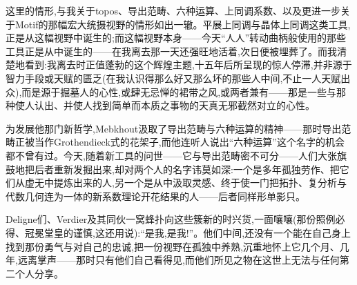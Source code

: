 \noindent 这里的情形,与我关于topos、导出范畴、六种运算、上同调系数、以及更进一步关于Motif的那幅宏大统摄视野的情形如出一辙。平展上同调与晶体上同调这类工具,正是从这幅视野中诞生的;而这幅视野本身——今天“人人”转动曲柄般使用的那些工具正是从中诞生的——在我离去那一天还强旺地活着,次日便被埋葬了。而我清楚地看到:我离去时正值蓬勃的这个辉煌主题,十五年后所呈现的惊人停滞,并非源于智力手段或天赋的匮乏(在我认识得那么好又那么坏的那些人中间,不止一人天赋出众),而是源于掘墓人的心性,或肆无忌惮的裙带之风,或两者兼有——那是一些与那种使人认出、并使人找到简单而本质之事物的天真无邪截然对立的心性。

\noindent 为发展他那门新哲学,Mebkhout汲取了导出范畴与六种运算的精神——那时导出范畴正被当作Grothendieck式的花架子,而他连听人说出“六种运算”这个名字的机会都不曾有过。今天,随着新工具的问世——它与导出范畴密不可分——人们大张旗鼓地把后者重新发掘出来,却对两个人的名字讳莫如深:一个是多年孤独劳作、把它们从虚无中提炼出来的人,另一个是从中汲取灵感、终于使一门把拓扑、复分析与代数几何连为一体的新系数理论开花结果的人——后者同样形单影只。

\dmark{}Deligne们、Verdier及其同伙一窝蜂扑向这些簇新的时兴货,一面嚷嚷(那份照例必得、冠冕堂皇的谨慎,这还用说):“是我,是我!”。他们中间,还没有一个能在自己身上找到那份勇气与对自己的忠诚,把一份视野在孤独中养熟,沉重地怀上它几个月、几年,远离掌声——那时只有他们自己看得见,而他们所见之物在这世上无法与任何第二个人分享。

